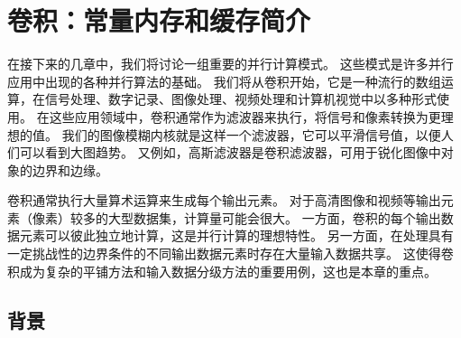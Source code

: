 \section{卷积：常量内存和缓存简介}
在接下来的几章中，我们将讨论一组重要的并行计算模式。 这些模式是许多并行应用中出现的各种并行算法的基础。 我们将从卷积开始，它是一种流行的数组运算，在信号处理、数字记录、图像处理、视频处理和计算机视觉中以多种形式使用。 在这些应用领域中，卷积通常作为滤波器来执行，将信号和像素转换为更理想的值。 我们的图像模糊内核就是这样一个滤波器，它可以平滑信号值，以便人们可以看到大图趋势。 又例如，高斯滤波器是卷积滤波器，可用于锐化图像中对象的边界和边缘。

卷积通常执行大量算术运算来生成每个输出元素。 对于高清图像和视频等输出元素（像素）较多的大型数据集，计算量可能会很大。 一方面，卷积的每个输出数据元素可以彼此独立地计算，这是并行计算的理想特性。 另一方面，在处理具有一定挑战性的边界条件的不同输出数据元素时存在大量输入数据共享。 这使得卷积成为复杂的平铺方法和输入数据分级方法的重要用例，这也是本章的重点。

\subsection{背景}